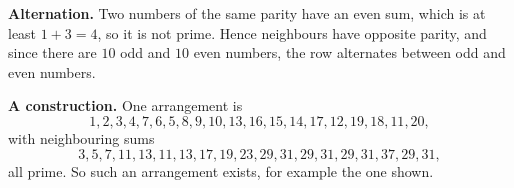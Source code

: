\textbf{Alternation.} Two numbers of the same parity have an even sum, which is at least $1+3=4$, so it is not prime. Hence neighbours have opposite parity, and since there are $10$ odd and $10$ even numbers, the row alternates between odd and even numbers.

\textbf{A construction.} One arrangement is
\[1,2,3,4,7,6,5,8,9,10,13,16,15,14,17,12,19,18,11,20,\]
with neighbouring sums
\[3,5,7,11,13,11,13,17,19,23,29,31,29,31,29,31,37,29,31,\]
all prime. So such an arrangement exists, for example the one shown.

